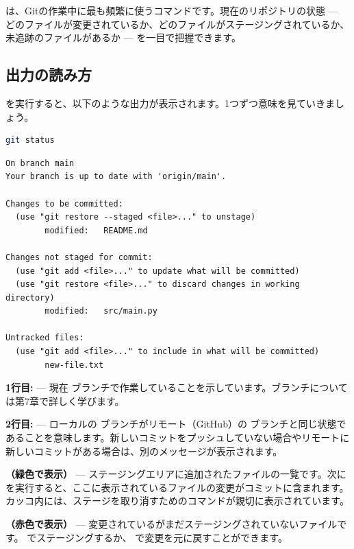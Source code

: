  は、Gitの作業中に最も頻繁に使うコマンドです。現在のリポジトリの状態 — どのファイルが変更されているか、どのファイルがステージングされているか、未追跡のファイルがあるか — を一目で把握できます。

\subsection{出力の読み方}

 を実行すると、以下のような出力が表示されます。1つずつ意味を見ていきましょう。

\begin{lstlisting}[language=bash]
git status
\end{lstlisting}

\begin{lstlisting}[language={}]
On branch main
Your branch is up to date with 'origin/main'.

Changes to be committed:
  (use "git restore --staged <file>..." to unstage)
        modified:   README.md

Changes not staged for commit:
  (use "git add <file>..." to update what will be committed)
  (use "git restore <file>..." to discard changes in working directory)
        modified:   src/main.py

Untracked files:
  (use "git add <file>..." to include in what will be committed)
        new-file.txt
\end{lstlisting}

\textbf{1行目: } — 現在  ブランチで作業していることを示しています。ブランチについては第7章で詳しく学びます。

\textbf{2行目: } — ローカルの  ブランチがリモート（GitHub）の  ブランチと同じ状態であることを意味します。新しいコミットをプッシュしていない場合やリモートに新しいコミットがある場合は、別のメッセージが表示されます。

\textbf{（緑色で表示）} — ステージングエリアに追加されたファイルの一覧です。次に  を実行すると、ここに表示されているファイルの変更がコミットに含まれます。カッコ内には、ステージを取り消すためのコマンドが親切に表示されています。

\textbf{（赤色で表示）} — 変更されているがまだステージングされていないファイルです。 でステージングするか、 で変更を元に戻すことができます。

